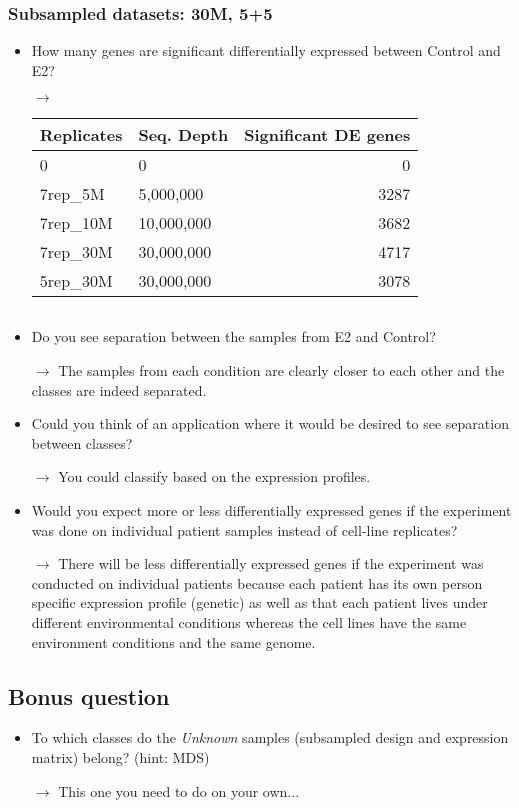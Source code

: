 \subsubsection{Subsampled datasets: 30M, 5+5}
\begin{itemize}
	\item How many genes are significant differentially expressed between Control and E2?
	\item[$\rightarrow$] \begin{tabular}{ | l | l | r | }
	\hline
	Replicates & Seq. Depth & Significant DE genes \\
	\hline
	0          & 0          & 0\quad\quad \\
	7rep\_5M   & 5,000,000  & 3287\quad\quad \\
	7rep\_10M  & 10,000,000 & 3682\quad\quad \\
	7rep\_30M  & 30,000,000 & 4717\quad\quad \\
	5rep\_30M  & 30,000,000 & 3078\quad\quad \\
	\hline
	\end{tabular}
	\item[$$]
	\item Do you see separation between the samples from E2 and Control?
	\item[$\rightarrow$] The samples from each condition are clearly closer to each other and the classes are indeed separated.
	\item Could you think of an application where it would be desired to see separation between classes?
	\item[$\rightarrow$] You could classify based on the expression profiles.
	\item Would you expect more or less differentially expressed genes if the experiment was done on individual patient samples instead of cell-line replicates?
	\item[$\rightarrow$] There will be less differentially expressed genes if the experiment was conducted on individual patients because each patient has its own person specific expression profile (genetic) as well as that each patient lives under different environmental conditions whereas the cell lines have the same environment conditions and the same genome.
\end{itemize}

\subsection{Bonus question}
\begin{itemize}
	\item To which classes do the \textit{Unknown} samples (subsampled design and expression matrix) belong? (hint: MDS)
	\item[$\rightarrow$] This one you need to do on your own...
\end{itemize}
